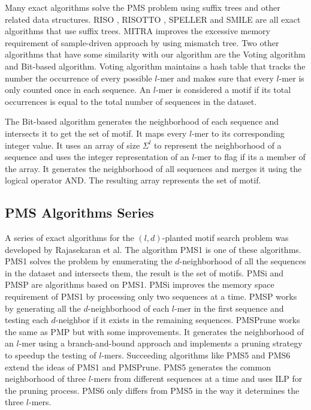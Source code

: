 Many exact algorithms solve the PMS problem using suffix trees and other related data structures. RISO \cite{Carvalho05ahighly}, RISOTTO \cite{Pisanti06risotto}, SPELLER \cite{Sagot98spellingapproximate} and SMILE are all exact algorithms that use suffix trees. MITRA \cite{eskin2002finding} improves the excessive memory requirement of sample-driven approach by using mismatch tree. Two other algorithms that have some similarity with our algorithm are the Voting algorithm and Bit-based algorithm. Voting algorithm \cite{Chin2005} maintains a hash table that tracks the number the occurrence of every possible $l$-mer and makes sure that every $l$-mer is only counted once in each sequence. An $l$-mer is considered a motif if its total occurrences is equal to the total number of sequences in the dataset.

The Bit-based algorithm \cite{dasari2010efficient} generates the neighborhood of each sequence and intersects it to get the set of motif. It maps every $l$-mer to its corresponding integer value. It uses an array of size $\Sigma^l$ to represent the neighborhood of a sequence and uses the integer representation of an $l$-mer to flag if its a member of the array. It generates the neighborhood of all sequences and merges it using the logical operator AND. The resulting array represents the set of motif.


\subsection{PMS Algorithms Series}
A series of exact algorithms for the $(l, d)$-planted motif search problem was developed by Rajasekaran et al. The algorithm PMS1 \cite{ExactAlgorithmsPMS} is one of these algorithms. PMS1 solves the problem by enumerating the $d$-neighborhood of all the sequences in the dataset and intersects them, the result is the set of motifs. PMSi and PMSP \cite{Davila2006} are algorithms based on PMS1. PMSi improves the memory space requirement of PMS1 by processing only two sequences at a time. PMSP works by generating all the $d$-neighborhood of each $l$-mer in the first sequence and testing each $d$-neighbor if it exists in the remaining sequences. PMSPrune \cite{pms2007} works the same as PMP but with some improvements. It generates the neighborhood of an $l$-mer using a branch-and-bound approach and implements a pruning strategy to speedup the testing of $l$-mers. Succeeding algorithms like PMS5 \cite{Dinh2011} and PMS6 \cite{Shibdas2014} extend the ideas of PMS1 and PMSPrune. PMS5 generates the common neighborhood of three $l$-mers from different sequences at a time and uses ILP for the pruning process. PMS6 only differs from PMS5 in the way it determines the three $l$-mers.

